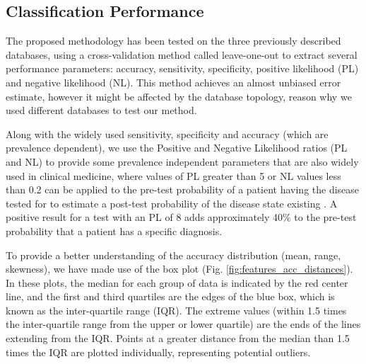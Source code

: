 \subsection{Classification Performance}

The proposed methodology has been tested on the three previously described databases, using a cross-validation method called leave-one-out to extract several performance parameters: accuracy, sensitivity, specificity, positive likelihood (PL) and negative likelihood (NL). This method achieves an almost unbiased error estimate, however it might be affected by the database topology, reason why we used different databases to test our method.

Along with the widely used sensitivity, specificity and accuracy (which are prevalence dependent), we use the Positive and Negative Likelihood ratios (PL and NL) to provide some prevalence independent parameters that are also widely used in clinical medicine, where values of PL greater than 5 or NL values less than 0.2 can be applied to the pre-test probability of a patient having the disease tested for to estimate a post-test probability of the disease state existing \cite{McGee2002}. A positive result for a test with an PL of 8 adds approximately 40\% to the pre-test probability that a patient has a specific diagnosis. 

To provide a better understanding of the accuracy distribution (mean, range, skewness), we have made use of the box plot (Fig. \ref{fig:features_acc_distances}). In these plots, the median for each group of data is indicated by the red center line, and the first and third quartiles are the edges of the blue box, which is known as the inter-quartile range (IQR). The extreme values (within 1.5 times the inter-quartile range from the upper or lower quartile) are the ends of the lines extending from the IQR. Points at a greater distance from the median than 1.5 times the IQR are plotted individually, representing potential outliers. 


